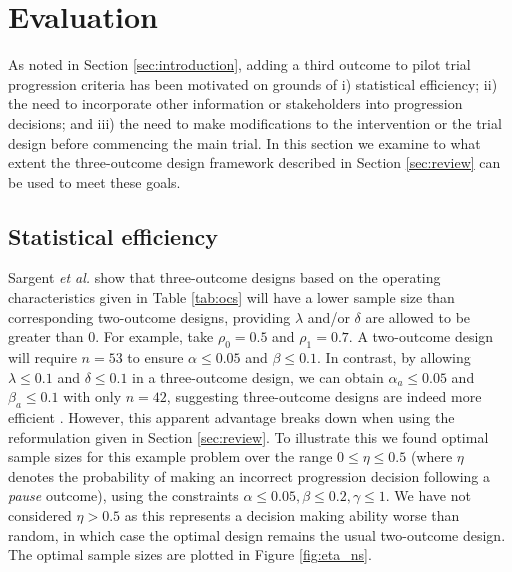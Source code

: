 \documentclass{bmcart}
\begin{document}
\section{Evaluation}\label{sec:evaluation}

As noted in Section \ref{sec:introduction}, adding a third outcome to pilot trial progression criteria has been motivated on grounds of i) statistical efficiency; ii) the need to incorporate other information or stakeholders into progression decisions; and iii) the need to make modifications to the intervention or the trial design before commencing the main trial. In this section we examine to what extent the three-outcome design framework described in Section \ref{sec:review} can be used to meet these goals.

\subsection{Statistical efficiency}\label{sec:efficiency}

Sargent \emph{et al.} show that three-outcome designs based on the operating characteristics given in Table \ref{tab:ocs} will have a lower sample size than corresponding two-outcome designs, providing $\lambda$ and/or $\delta$ are allowed to be greater than 0. For example, take $\rho_0 = 0.5$ and $\rho_1 = 0.7$. A two-outcome design will require $n = 53$ to ensure $\alpha \leq 0.05$ and $\beta \leq 0.1$. In contrast, by allowing $\lambda \leq 0.1$ and $\delta \leq 0.1$ in a three-outcome design, we can obtain $\alpha_a \leq 0.05$ and $\beta_a \leq 0.1$ with only $n = 42$, suggesting three-outcome designs are indeed more efficient \cite{Sargent2001, Hong2007}. However, this apparent advantage breaks down when using the reformulation given in Section \ref{sec:review}. To illustrate this we found optimal sample sizes for this example problem over the range $0 \leq \eta \leq 0.5$ (where $\eta$ denotes the probability of making an incorrect progression decision following a \emph{pause} outcome), using the constraints $\alpha \leq 0.05, \beta \leq 0.2, \gamma \leq 1$. We have not considered $\eta > 0.5$ as this represents a decision making ability worse than random, in which case the optimal design remains the usual two-outcome design. The optimal sample sizes are plotted in Figure \ref{fig:eta_ns}.
\end{document}
